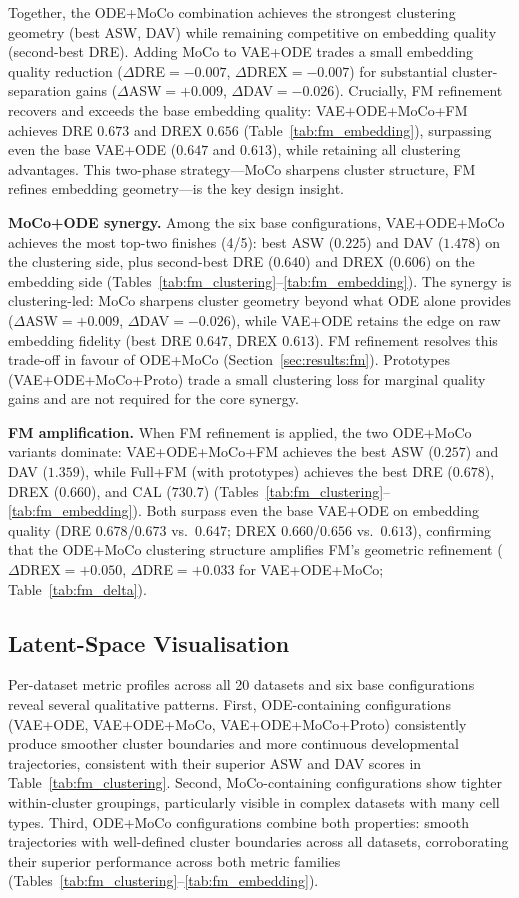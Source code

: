 \documentclass[journal]{IEEEtran}
\begin{document}
Together, the ODE+MoCo combination achieves the strongest clustering geometry (best ASW, DAV) while remaining competitive on embedding quality (second-best DRE). Adding MoCo to VAE+ODE trades a small embedding quality reduction ($\Delta$DRE$=-0.007$, $\Delta$DREX$=-0.007$) for substantial cluster-separation gains ($\Delta$ASW$=+0.009$, $\Delta$DAV$=-0.026$). Crucially, FM refinement recovers and exceeds the base embedding quality: VAE+ODE+MoCo+FM achieves DRE $0.673$ and DREX $0.656$ (Table~\ref{tab:fm_embedding}), surpassing even the base VAE+ODE ($0.647$ and $0.613$), while retaining all clustering advantages. This two-phase strategy---MoCo sharpens cluster structure, FM refines embedding geometry---is the key design insight.

\textbf{MoCo+ODE synergy.}
Among the six base configurations, VAE+ODE+MoCo achieves the most top-two finishes (4/5): best ASW ($0.225$) and DAV ($1.478$) on the clustering side, plus second-best DRE ($0.640$) and DREX ($0.606$) on the embedding side (Tables~\ref{tab:fm_clustering}--\ref{tab:fm_embedding}). The synergy is clustering-led: MoCo sharpens cluster geometry beyond what ODE alone provides ($\Delta$ASW$=+0.009$, $\Delta$DAV$=-0.026$), while VAE+ODE retains the edge on raw embedding fidelity (best DRE $0.647$, DREX $0.613$). FM refinement resolves this trade-off in favour of ODE+MoCo (Section~\ref{sec:results:fm}). Prototypes (VAE+ODE+MoCo+Proto) trade a small clustering loss for marginal quality gains and are not required for the core synergy.

\textbf{FM amplification.}
When FM refinement is applied, the two ODE+MoCo variants dominate: VAE+ODE+MoCo+FM achieves the best ASW ($0.257$) and DAV ($1.359$), while Full+FM (with prototypes) achieves the best DRE ($0.678$), DREX ($0.660$), and CAL ($730.7$) (Tables~\ref{tab:fm_clustering}--\ref{tab:fm_embedding}). Both surpass even the base VAE+ODE on embedding quality (DRE $0.678$/$0.673$ vs.\ $0.647$; DREX $0.660$/$0.656$ vs.\ $0.613$), confirming that the ODE+MoCo clustering structure amplifies FM's geometric refinement ($\Delta$DREX$=+0.050$, $\Delta$DRE$=+0.033$ for VAE+ODE+MoCo; Table~\ref{tab:fm_delta}).

\subsection{Latent-Space Visualisation}
\label{sec:results:umap}

Per-dataset metric profiles across all 20 datasets and six base configurations reveal several qualitative patterns. First, ODE-containing configurations (VAE+ODE, VAE+ODE+MoCo, VAE+ODE+MoCo+Proto) consistently produce smoother cluster boundaries and more continuous developmental trajectories, consistent with their superior ASW and DAV scores in Table~\ref{tab:fm_clustering}. Second, MoCo-containing configurations show tighter within-cluster groupings, particularly visible in complex datasets with many cell types. Third, ODE+MoCo configurations combine both properties: smooth trajectories with well-defined cluster boundaries across all datasets, corroborating their superior performance across both metric families (Tables~\ref{tab:fm_clustering}--\ref{tab:fm_embedding}).
\end{document}
